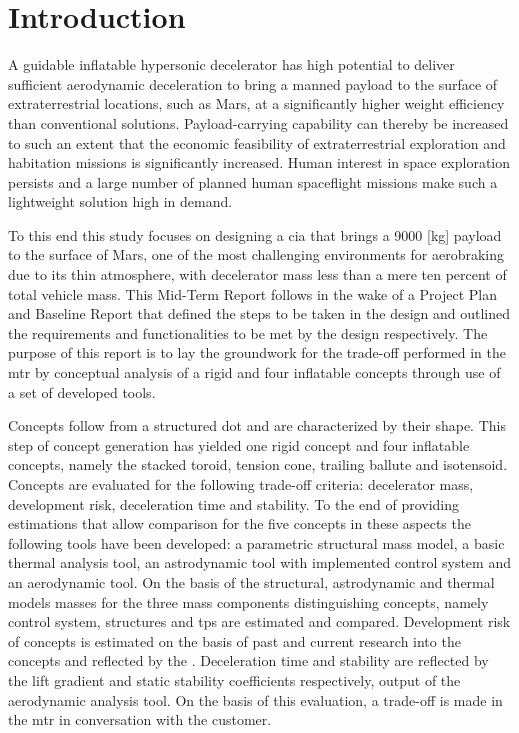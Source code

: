 \section{Introduction}
\label{cha:introduction}
A guidable inflatable hypersonic decelerator has high potential to deliver sufficient aerodynamic deceleration to bring a manned payload to the surface of extraterrestrial locations, such as Mars, at a significantly higher weight efficiency than conventional solutions. Payload-carrying capability can thereby be increased to such an extent that the economic feasibility of extraterrestrial exploration and habitation missions is significantly increased. Human interest in space exploration persists and a large number of planned human spaceflight missions make such a lightweight solution high in demand. 

To this end this study focuses on designing a \acrfull{cia} that brings a 9000 [kg] payload to the surface of Mars, one of the most challenging environments for aerobraking due to its thin atmosphere, with decelerator mass less than a mere ten percent of total vehicle mass. This Mid-Term Report follows in the wake of a Project Plan and Baseline Report that defined the steps to be taken in the design and outlined the requirements and functionalities to be met by the design respectively. The purpose of this report is to lay the groundwork for the trade-off performed in the \acrfull{mtr} by conceptual analysis of a rigid and four inflatable concepts through use of a set of developed tools.

Concepts follow from a structured \acrfull{dot} and are characterized by their shape. This step of concept generation has yielded one rigid concept and four inflatable concepts, namely the stacked toroid, tension cone, trailing ballute and isotensoid. Concepts are evaluated for the following trade-off criteria: decelerator mass, development risk, deceleration time and stability. To the end of providing estimations that allow comparison for the five concepts in these aspects the following tools have been developed: a parametric structural mass model, a basic thermal analysis tool, an astrodynamic tool with implemented control system and an aerodynamic tool. On the basis of the structural, astrodynamic and thermal models masses for the three mass components distinguishing concepts, namely control system, structures and \acrfull{tps} are estimated and compared. Development risk of concepts is estimated on the basis of past and current research into the concepts and reflected by the . Deceleration time and stability are reflected by the lift gradient and static stability coefficients respectively, output of the aerodynamic analysis tool. On the basis of this evaluation, a trade-off is made in the \gls{mtr} in conversation with the customer.

